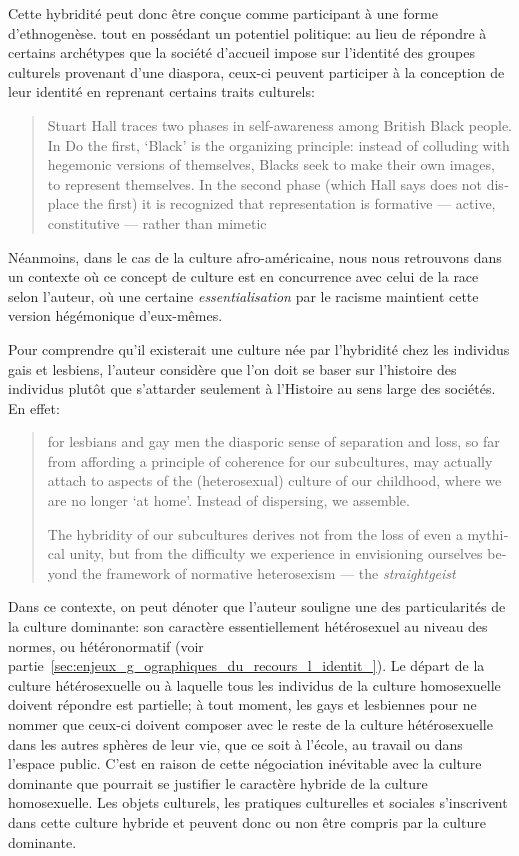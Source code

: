 Cette hybridité peut donc être conçue comme participant à une forme d'ethnogenèse. tout en possédant un potentiel politique: au lieu de répondre à certains archétypes que la société d'accueil impose sur l'identité des groupes culturels provenant d'une diaspora, ceux-ci peuvent participer à la conception de leur identité en reprenant certains traits culturels:
\foreignblockquote{english}[{\cite[277]{Sinfield1996}}][.]{Stuart Hall traces two phases in self-awareness among British Black people. In Do the first, `Black' is the organizing principle: instead of colluding with hegemonic versions of themselves, Blacks seek to make their own images, to represent themselves. In the second phase (which Hall says does not displace the first) it is recognized that representation is formative --- active, constitutive --- rather than mimetic}.
Néanmoins, dans le cas de la culture afro-américaine, nous nous retrouvons dans un contexte où ce concept de culture est en concurrence avec celui de la race selon l'auteur, où une certaine \emph{essentialisation} par le racisme maintient cette version hégémonique d'eux-mêmes.

Pour comprendre qu'il existerait une culture née par l'hybridité chez les individus gais et lesbiens, l'auteur considère que l'on doit se baser sur l'histoire des individus plutôt que s'attarder seulement à l'Histoire au sens large des sociétés.
En effet: \foreignblockquote{english}[{\cite[280]{Sinfield1996}}][.]{\textelp{} for lesbians and gay men the diasporic sense of separation and loss, so far from affording a principle of coherence for our subcultures, may actually attach to aspects of the (heterosexual) culture of our childhood, where we are no longer `at home'. Instead of dispersing, we assemble.

The hybridity of our subcultures derives not from the loss of even a mythical unity, but from the difficulty we experience in envisioning ourselves beyond the framework of normative heterosexism --- the \emph{straightgeist} \textelp{}}
Dans ce contexte, on peut dénoter que l'auteur souligne une des particularités de la culture dominante: son caractère essentiellement hétérosexuel au niveau des normes, ou hétéronormatif (voir partie~\ref{sec:enjeux_g_ographiques_du_recours_l_identit_}).
Le départ de la culture hétérosexuelle ou  à laquelle tous les individus de la culture homosexuelle doivent répondre est partielle; à tout moment, les gays et lesbiennes pour ne nommer que ceux-ci doivent composer avec le reste de la culture hétérosexuelle dans les autres sphères de leur vie, que ce soit à l'école, au travail ou dans l'espace public.
C'est en raison de cette négociation inévitable avec la culture dominante que pourrait se justifier le caractère hybride de la culture homosexuelle.
Les objets culturels, les pratiques culturelles et sociales s'inscrivent dans cette culture hybride et peuvent donc ou non être compris par la culture dominante.

